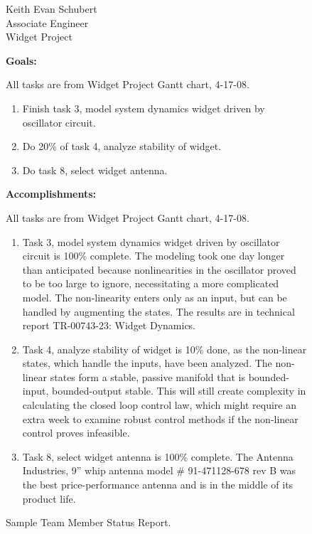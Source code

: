 \begin{figure*}[p]
\begin{center}
\caption{Sample Team Member Status Report.}\label{letter-member-status-report}
\vspace{.1in}
\begin{minipage}{4in}
\begin{flushright}
Keith Evan Schubert\\
Associate Engineer\\
Widget Project
\end{flushright}

\textbf{Goals:}

All tasks are from Widget Project Gantt chart, 4-17-08.
\begin{enumerate}
\item Finish task 3, model system dynamics widget driven by oscillator circuit.
\item Do 20\% of task 4, analyze stability of widget.
\item Do task 8, select widget antenna.
\end{enumerate}


\textbf{Accomplishments:}

All tasks are from Widget Project Gantt chart, 4-17-08.
\begin{enumerate}
\item Task 3, model system dynamics widget driven by oscillator circuit is 100\% complete.  The modeling took one day longer than anticipated because nonlinearities in the oscillator proved to be too large to ignore, necessitating a more complicated model.  The non-linearity enters only as an input, but can be handled by augmenting the states.  The results are in technical report TR-00743-23: Widget Dynamics.
\item Task 4, analyze stability of widget is 10\% done, as the non-linear states, which handle the inputs, have been analyzed.  The non-linear states form a stable, passive manifold that is bounded-input, bounded-output stable.  This will still create complexity in calculating the closed loop control law, which might require an extra week to examine robust control methods if the non-linear control proves infeasible.
\item Task 8, select widget antenna is 100\% complete.  The Antenna Industries, 9'' whip antenna model \# 91-471128-678 rev B was the best price-performance antenna and is in the middle of its product life.
\end{enumerate}


\end{minipage}
\end{center}
\end{figure*}
